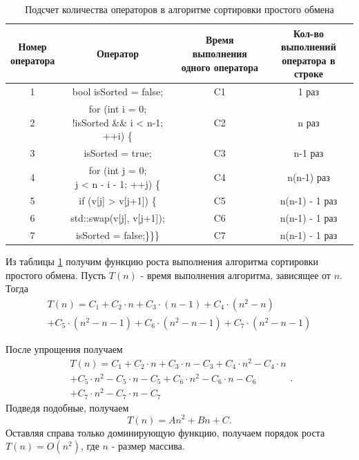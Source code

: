 \documentclass[a4paper, 14pt]{extarticle}
\begin{document}
\begin{table}[htpb]
  \centering
  \caption{Подсчет количества операторов в алгоритме сортировки простого обмена}
  \label{tab:first_sort_speed}
  \begin{tabular}{|c|c|c|c|}
    \hline
    \parbox[m]{2cm}{\centering Номер \\ оператора}
    & Оператор
    & \parbox[m]{2cm}{\centering Время выполнения \\ одного оператора}
    & \parbox[m]{2cm}{\centering Кол-во выполнений \\ оператора в строке}
    \\  & bool isSorted = false; & C1 & 1 раз
    \\  & \parbox[m]{4cm}{\centering for (int i = 0;\\ !isSorted \&\& i < n-1; ++i) \{ }
      & C2 & n раз
    \\  & isSorted = true; & C3 & n-1 раз
      \\  &\parbox[m]{4cm}{\centering for (int j = 0;\\ j < n - i - 1;
         ++j) \{ } & C4 & n(n-1) раз
    \\  & if (v[j] > v[j+1]) \{  & C5 & n(n-1) - 1 раз
    \\  & std::swap(v[j], v[j+1]); & C6 & n(n-1) - 1 раз
    \\  & isSorted = false;\}\}\} & C7 & n(n-1) - 1 раз
\\ \hline
  \end{tabular}
\end{table}

Из таблицы \ref{tab:first_sort_speed} получим функцию роста выполнения алгоритма
сортировки простого обмена. Пусть $T(n)$ - время выполнения алгоритма, зависящее
от  $n$. Тогда
\[
  \begin{split}
  T(n) = C_1 + C_2\cdot n + C_3\cdot (n-1) + C_4\cdot (n^2-n) \\
  + C_5\cdot (n^2-n-1) + C_6\cdot (n^2-n-1) + C_7\cdot (n^2-n-1)
  \end{split}
\]

После упрощения получаем
\[
  \begin{split}
  T(n) = C_1 + C_2\cdot n + C_3 \cdot n - C_3 + C_4\cdot n^2
  - C_4\cdot n \\ + C_5\cdot n^2 - C_5\cdot n - C_5
  + C_6\cdot n^2 - C_6\cdot n - C_6\\ + C_7\cdot n^2 - C_7\cdot n - C_7 
  \end{split}
.\]
Подведя подобные, получаем
\[
  T(n) = An^2+Bn+C
.\]
Оставляя справа только доминирующую функцию, получаем порядок роста $T(n)
= O(n^2)$, где  $n$ - размер массива.
\end{document}
